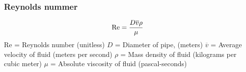 \documentclass{beamer}
\begin{document}
\begin{frame}
	\frametitle{Reynolds nummer}

	


%
%
%
%
$$\hbox{Re} = {{D \overline{v} \rho} \over \mu}$$
%
%
Re = Reynolds number (unitless)
%
$D$ = Diameter of pipe, (meters)
%
$\overline{v}$ = Average velocity of fluid (meters per second)
%
$\rho$ = Mass density of fluid (kilograms per cubic meter)
%
$\mu$ = Absolute viscosity of fluid (pascal-seconds)
%
\end{frame}
%
%
%
%
%
%
%
%
%
%
%
%
%
%
%
%
\end{document}
